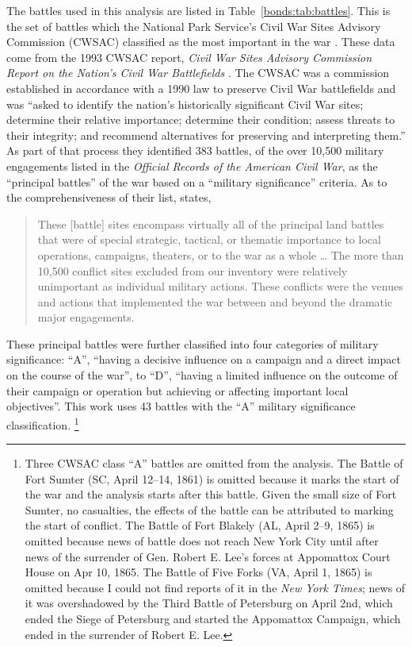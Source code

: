 The battles used in this analysis are listed in Table~\ref{bonds:tab:battles}.
This is the set of battles which the National Park Service's Civil War Sites Advisory Commission (CWSAC) classified as the most important in the war \parencite{CWSAC1993}.
These data come from the 1993 CWSAC report, \textit{Civil War Sites Advisory Commission Report on the Nation's Civil War Battlefields} \parencites{CWSAC1993}{CWSAC1993b}.
The CWSAC was a commission established in accordance with a 1990 law to preserve Civil War battlefields and was ``asked to identify the nation's historically significant Civil War sites; determine their relative importance; determine their condition; assess threats to their integrity; and recommend alternatives for preserving and interpreting them.'' \parencite{CWSAC1993b}
As part of that process they identified 383 battles, of the over 10,500 military engagements listed in the \textit{Official Records of the American Civil War}, as the ``principal battles'' of the war based on a ``military significance'' criteria.
As to the comprehensiveness of their list, \parencite{CWSAC1993} states,
\begin{quote}
  These [battle] sites encompass virtually all of the principal land battles that were of special strategic, tactical, or thematic importance to local operations, campaigns, theaters, or to the war as a whole \dots{}
  The more than 10,500 conflict sites excluded from our inventory were relatively unimportant as individual military actions.
  These conflicts were the venues and actions that implemented the war between and beyond the dramatic major engagements.
\end{quote}
These principal battles were further classified into four categories of military significance: ``A'', ``having a decisive influence on a campaign and a direct impact on the course of the war'', to ``D'', ``having a limited influence on the outcome of their campaign or operation but achieving or affecting important local objectives''.
This work uses 43 battles with the ``A'' military significance classification.%
\footnote{
  Three CWSAC class ``A'' battles are omitted from the analysis.
  The Battle of Fort Sumter (SC, April 12--14, 1861) is omitted because it marks the start of the war and the analysis starts after this battle.
  Given the small size of Fort Sumter, no casualties, the effects of the battle can be attributed to marking the start of conflict.
  The Battle of Fort Blakely (AL, April 2--9, 1865) is omitted because news of battle does not reach New York City until after news of the surrender of Gen. Robert E. Lee's forces at Appomattox Court House on Apr 10, 1865.
  The Battle of Five Forks (VA, April 1, 1865) is omitted because I could not find reports of it in the \textit{New York Times}; news of it was overshadowed by the Third Battle of Petersburg on April 2nd, which ended the Siege of Petersburg and started the Appomattox Campaign, which ended in the surrender of Robert E. Lee.
}
